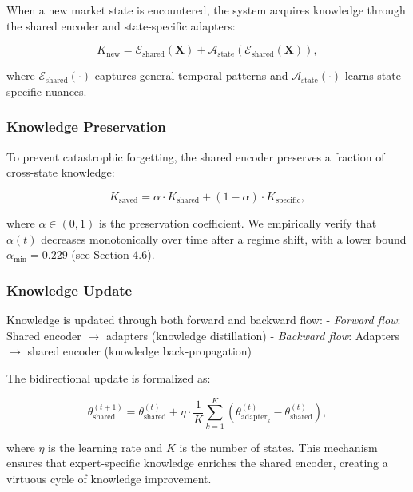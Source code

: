 \documentclass[review]{elsarticle}
\begin{document}
When a new market state is encountered, the system acquires knowledge through the shared encoder and state-specific adapters:

\begin{equation}
K_{\text{new}} = \mathcal{E}_{\text{shared}}(\mathbf{X}) + \mathcal{A}_{\text{state}}(\mathcal{E}_{\text{shared}}(\mathbf{X})),
\end{equation}

where $\mathcal{E}_{\text{shared}}(\cdot)$ captures general temporal patterns and $\mathcal{A}_{\text{state}}(\cdot)$ learns state-specific nuances.

\subsubsection{Knowledge Preservation}

To prevent catastrophic forgetting, the shared encoder preserves a fraction of cross-state knowledge:

\begin{equation}
K_{\text{saved}} = \alpha \cdot K_{\text{shared}} + (1-\alpha) \cdot K_{\text{specific}},
\end{equation}

where $\alpha \in (0,1)$ is the preservation coefficient. We empirically verify that $\alpha(t)$ decreases monotonically over time after a regime shift, with a lower bound $\alpha_{\min} = 0.229$ (see Section 4.6).

\subsubsection{Knowledge Update}

Knowledge is updated through both forward and backward flow:
- \textit{Forward flow}: Shared encoder $\to$ adapters (knowledge distillation)
- \textit{Backward flow}: Adapters $\to$ shared encoder (knowledge back-propagation)

The bidirectional update is formalized as:

\begin{equation}
\theta_{\text{shared}}^{(t+1)} = \theta_{\text{shared}}^{(t)} + \eta \cdot \frac{1}{K} \sum_{k=1}^{K} (\theta_{\text{adapter}_k}^{(t)} - \theta_{\text{shared}}^{(t)}),
\end{equation}

where $\eta$ is the learning rate and $K$ is the number of states. This mechanism ensures that expert-specific knowledge enriches the shared encoder, creating a virtuous cycle of knowledge improvement.
\end{document}
